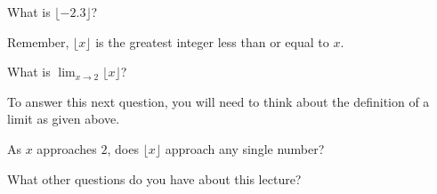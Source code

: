 \documentclass{ximera}
\begin{document}
\begin{question}
What is $\lfloor -2.3\rfloor$?
\begin{hint}
Remember, $\lfloor x\rfloor$ is the greatest integer less than or
equal to $x$.
\end{hint}
\begin{multipleChoice}
\end{multipleChoice}
\end{question}



\begin{question}
What is $\lim_{x\to 2}\lfloor x\rfloor$?
\begin{hint}
To answer this next question, you will need to think about the
definition of a limit as given above.
\end{hint}
\begin{hint}
As $x$ approaches $2$, does $\lfloor x\rfloor$ approach any single number?
\end{hint}
\begin{multipleChoice}
\end{multipleChoice}
\end{question}


\begin{question}
What other questions do you have about this lecture?
\begin{freeResponse}
\end{freeResponse}
\end{question}
\end{document}
